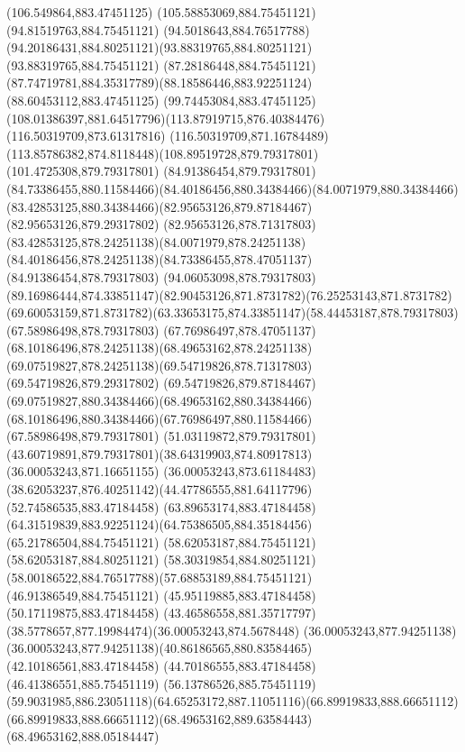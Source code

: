 {{\lineto(106.549864,883.47451125)
\lineto(105.58853069,884.75451121)
\lineto(94.81519763,884.75451121)
\curveto(94.5018643,884.76517788)(94.20186431,884.80251121)(93.88319765,884.80251121)
\lineto(93.88319765,884.75451121)
\lineto(87.28186448,884.75451121)
\curveto(87.74719781,884.35317789)(88.18586446,883.92251124)(88.60453112,883.47451125)
\lineto(99.74453084,883.47451125)
\curveto(108.01386397,881.64517796)(113.87919715,876.40384476)(116.50319709,873.61317816)
\lineto(116.50319709,871.16784489)
\curveto(113.85786382,874.8118448)(108.89519728,879.79317801)(101.4725308,879.79317801)
\lineto(84.91386454,879.79317801)
\curveto(84.73386455,880.11584466)(84.40186456,880.34384466)(84.0071979,880.34384466)
\curveto(83.42853125,880.34384466)(82.95653126,879.87184467)(82.95653126,879.29317802)
\curveto(82.95653126,878.71317803)(83.42853125,878.24251138)(84.0071979,878.24251138)
\curveto(84.40186456,878.24251138)(84.73386455,878.47051137)(84.91386454,878.79317803)
\lineto(94.06053098,878.79317803)
\curveto(89.16986444,874.33851147)(82.90453126,871.8731782)(76.25253143,871.8731782)
\curveto(69.60053159,871.8731782)(63.33653175,874.33851147)(58.44453187,878.79317803)
\lineto(67.58986498,878.79317803)
\curveto(67.76986497,878.47051137)(68.10186496,878.24251138)(68.49653162,878.24251138)
\curveto(69.07519827,878.24251138)(69.54719826,878.71317803)(69.54719826,879.29317802)
\curveto(69.54719826,879.87184467)(69.07519827,880.34384466)(68.49653162,880.34384466)
\curveto(68.10186496,880.34384466)(67.76986497,880.11584466)(67.58986498,879.79317801)
\lineto(51.03119872,879.79317801)
\curveto(43.60719891,879.79317801)(38.64319903,874.80917813)(36.00053243,871.16651155)
\lineto(36.00053243,873.61184483)
\curveto(38.62053237,876.40251142)(44.47786555,881.64117796)(52.74586535,883.47184458)
\lineto(63.89653174,883.47184458)
\curveto(64.31519839,883.92251124)(64.75386505,884.35184456)(65.21786504,884.75451121)
\lineto(58.62053187,884.75451121)
\lineto(58.62053187,884.80251121)
\curveto(58.30319854,884.80251121)(58.00186522,884.76517788)(57.68853189,884.75451121)
\lineto(46.91386549,884.75451121)
\lineto(45.95119885,883.47184458)
\lineto(50.17119875,883.47184458)
\curveto(43.46586558,881.35717797)(38.5778657,877.19984474)(36.00053243,874.5678448)
\lineto(36.00053243,877.94251138)
\curveto(36.00053243,877.94251138)(40.86186565,880.83584465)(42.10186561,883.47184458)
\lineto(44.70186555,883.47184458)
\lineto(46.41386551,885.75451119)
\lineto(56.13786526,885.75451119)
\curveto(59.9031985,886.23051118)(64.65253172,887.11051116)(66.89919833,888.66651112)
\curveto(66.89919833,888.66651112)(68.49653162,889.63584443)(68.49653162,888.05184447)
}}
